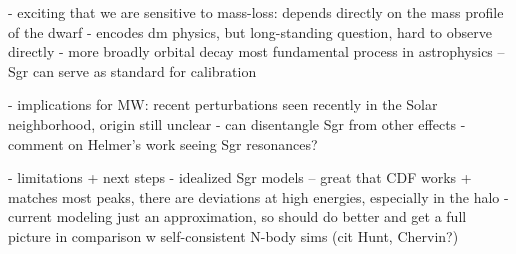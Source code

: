 \documentclass{natureprintstyle}
\begin{document}
- exciting that we are sensitive to mass-loss: depends directly on the mass profile of the dwarf
- encodes dm physics, but long-standing question, hard to observe directly
- more broadly orbital decay most fundamental process in astrophysics -- Sgr can serve as standard for calibration

- implications for MW: recent perturbations seen recently in the Solar neighborhood, origin still unclear
- can disentangle Sgr from other effects
- comment on Helmer's work seeing Sgr resonances?

- limitations + next steps
- idealized Sgr models -- great that CDF works + matches most peaks, there are deviations at high energies, especially in the halo
- current modeling just an approximation, so should do better and get a full picture in comparison w self-consistent N-body sims (cit Hunt, Chervin?)




% 
{\small}
\end{document}
